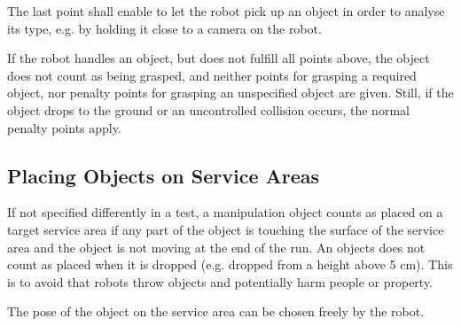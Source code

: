 \par
The last point shall enable to let the robot pick up an object in order to analyse its type, e.g. by holding it close to a camera on the robot.
\par
If the robot handles an object, but does not fulfill all points above, the object does not count as being grasped, and neither points for grasping a required object, nor penalty points for grasping an unspecified object are given. Still, if the object drops to the ground or an uncontrolled collision occurs, the normal penalty points apply.

\subsection{Placing Objects on Service Areas} \label{ssec:PlacingObjects}
If not specified differently in a test, a manipulation object counts as placed on a target service area if any part of the object is touching the surface of the service area and the object is not moving at the end of the run. An objects does not count as placed when it is dropped (e.g. dropped from a height above 5 cm). This is to avoid that robots throw objects and potentially harm people or property.
\par
The pose of the object on the service area can be chosen freely by the robot.


